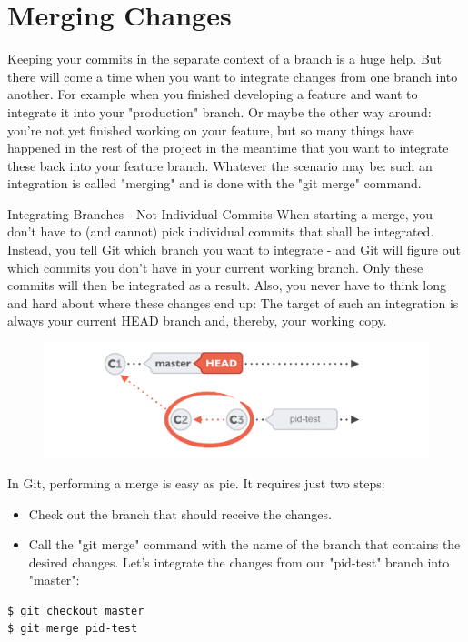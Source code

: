 \documentclass{article}
\begin{document}
\section{Merging Changes}
Keeping your commits in the separate context of a branch is a huge help. But there will come a time when you want to integrate changes from one branch into another. For example when you finished developing a feature and want to integrate it into your "production" branch. Or maybe the other way around: you're not yet finished working on your feature, but so many things have happened in the rest of the project in the meantime that you want to integrate these back into your feature branch.
\newline\newline
Whatever the scenario may be: such an integration is called "merging" and is done with the "git merge" command.
\begin{concept}
Integrating Branches - Not Individual Commits
\newline\newline
When starting a merge, you don't have to (and cannot) pick individual commits that shall be integrated. Instead, you tell Git which branch you want to integrate - and Git will figure out which commits you don't have in your current working branch. Only these commits will then be integrated as a result.
\newline\newline
Also, you never have to think long and hard about where these changes end up: The target of such an integration is always your current HEAD branch and, thereby, your working copy.
\begin{figure}[h]
    \centering
    \includegraphics[width=4.5in]{images/basic-merging.png}
\end{figure}
\end{concept}
In Git, performing a merge is easy as pie. It requires just two steps:
\begin{itemize}
    \item Check out the branch that should receive the changes.
    \item Call the "git merge" command with the name of the branch that contains the desired changes.
Let's integrate the changes from our "pid-test" branch into "master":
\end{itemize}
\begin{lstlisting}[language=bash]
$ git checkout master
$ git merge pid-test
\end{lstlisting}
\end{document}
